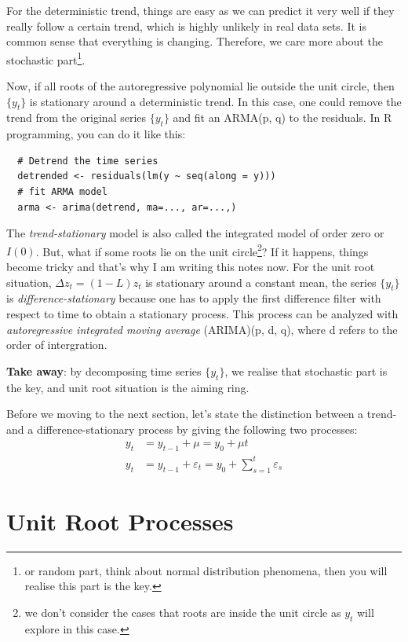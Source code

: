 \documentclass[12pt]{article}
\theoremstyle{definition}
\numberwithin{equation}{section}
\numberwithin{figure}{section}
\numberwithin{table}{section}
\begin{document}
For the deterministic trend, things are easy as we can predict it very well if they really follow a certain trend, which is highly unlikely in real data sets. It is common sense that everything is changing. Therefore, we care more about the stochastic part\footnote{or random part, think about normal distribution phenomena, then you will realise this part is the key.}.

Now, if all roots of the autoregressive polynomial lie outside the unit circle, then $\{y_t\}$ is stationary around a deterministic trend. In this case, one could remove the trend from the original series $\{y_t\}$ and fit an ARMA(p, q) to the residuals. In R programming, you can do it like this:
\begin{lstlisting}
  # Detrend the time series
  detrended <- residuals(lm(y ~ seq(along = y)))
  # fit ARMA model
  arma <- arima(detrend, ma=..., ar=...,)
\end{lstlisting}

The \textit{trend-stationary} model is also called the integrated model of order zero or $I(0)$. But, what if some roots lie on the unit circle\footnote{we don't consider the cases that roots are inside the unit circle as $y_t$ will explore in this case.}? If it happens, things become tricky and that's why I am writing this notes now. For the unit root situation, $\Delta z_t = (1-L) z_t$ is stationary around a constant mean, the series $\{y_t\}$ is \textit{difference-stationary} because one has to apply the first difference filter with respect to time to obtain a stationary process. This process can be analyzed with \textit{autoregressive integrated moving average} (ARIMA)(p, d, q), where d refers to the order of intergration.

\textbf{Take away}: by decomposing time series $\{y_t\}$, we realise that stochastic part is the key, and unit root situation is the aiming ring.

Before we moving to the next section, let's state the distinction between a trend- and a difference-stationary process by giving the following two processes:
\begin{align}
  y_t  & = y_{t-1} + \mu = y_0 + \mu t \\
  y_t & = y_{t-1} + \varepsilon_t = y_0 + \sum_{s=1}^t \varepsilon_s
\end{align}

\section{Unit Root Processes}
\end{document}
